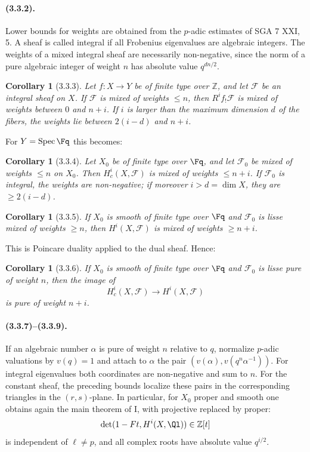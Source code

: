 \documentclass[11pt,a4paper]{article}
\newtheorem{corollary}[theorem]{Corollary}
\begin{document}
\paragraph{(3.3.2).}
Lower bounds for weights are obtained from the $p$-adic estimates of SGA 7 XXI, 5. A sheaf is called integral if all Frobenius eigenvalues are algebraic integers. The weights of a mixed integral sheaf are necessarily non-negative, since the norm of a pure algebraic integer of weight $n$ has absolute value $q^{dn/2}$.

\begin{corollary}[3.3.3]
Let $f:X\to Y$ be of finite type over $\mathbb Z$, and let $\mathcal F$ be an integral sheaf on $X$. If $\mathcal F$ is mixed of weights $\le n$, then $R^if_{!}\mathcal F$ is mixed of weights between $0$ and $n+i$. If $i$ is larger than the maximum dimension $d$ of the fibers, the weights lie between $2(i-d)$ and $n+i$.
\end{corollary}

For $Y=\operatorname{Spec}\Fq$ this becomes:

\begin{corollary}[3.3.4]
Let $X_0$ be of finite type over $\Fq$, and let $\mathcal F_0$ be mixed of weights $\le n$ on $X_0$. Then $H^i_c(X,\mathcal F)$ is mixed of weights $\le n+i$. If $\mathcal F_0$ is integral, the weights are non-negative; if moreover $i>d=\dim X$, they are $\ge2(i-d)$.
\end{corollary}

\begin{corollary}[3.3.5]
If $X_0$ is smooth of finite type over $\Fq$ and $\mathcal F_0$ is lisse mixed of weights $\ge n$, then $H^i(X,\mathcal F)$ is mixed of weights $\ge n+i$.
\end{corollary}
This is Poincare duality applied to the dual sheaf. Hence:

\begin{corollary}[3.3.6]
If $X_0$ is smooth of finite type over $\Fq$ and $\mathcal F_0$ is lisse pure of weight $n$, then the image of
\[
H^i_c(X,\mathcal F)\longrightarrow H^i(X,\mathcal F)
\]
is pure of weight $n+i$.
\end{corollary}

\paragraph{(3.3.7)--(3.3.9).}
If an algebraic number $\alpha$ is pure of weight $n$ relative to $q$, normalize $p$-adic valuations by $v(q)=1$ and attach to $\alpha$ the pair $(v(\alpha),v(q^n\alpha^{-1}))$. For integral eigenvalues both coordinates are non-negative and sum to $n$. For the constant sheaf, the preceding bounds localize these pairs in the corresponding triangles in the $(r,s)$-plane. In particular, for $X_0$ proper and smooth one obtains again the main theorem of I, with projective replaced by proper:
\[
\det(1-Ft,H^i(X,\Ql))\in\mathbb Z[t]
\]
is independent of $\ell\ne p$, and all complex roots have absolute value $q^{i/2}$.
\end{document}
